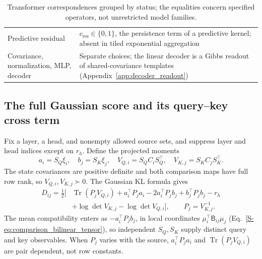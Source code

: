 \documentclass[twoside,11pt]{article}
\begin{document}
\begin{table}[tbp]
\begin{tabularx}{\textwidth}{@{}p{}X@{}}
Predictive residual & $c_{\mathrm{res}}\in\{0,1\}$, the persistence term of a predictive kernel; absent in tiled exponential aggregation \\
Covariance, normalization, MLP, decoder & Separate choices; the linear decoder is a Gibbs readout of shared-covariance templates (Appendix~\ref{app:decoder_readout}) \\
\bottomrule
\end{tabularx}
\caption{Transformer correspondences grouped by status; the equalities concern specified operators, not unrestricted model families.}
\label{tab:transformer_correspondence}
\end{table}

\subsection{The full Gaussian score and its query--key cross term}
\label{sec:dot_product_derivation}

Fix a layer, a head, and nonempty allowed source sets, and suppress layer and head indices except on $r_h$. Define the projected moments
\begin{equation}
a_i=S_Q\xi_i,\quad b_j=S_K\xi_j,\quad
V_{Q,i}=S_QC_iS_Q^\top,\quad V_{K,j}=S_KC_jS_K^\top.
\label{eq:projected_qk_moments}
\end{equation}
The state covariances are positive definite and both comparison maps have full row rank, so $V_{Q,i},V_{K,j}\succ0$. The Gaussian KL formula gives
\begin{align}
D_{ij}=\frac12\bigl[&\operatorname{Tr}(P_jV_{Q,i})
+a_i^\top P_ja_i-2a_i^\top P_jb_j+b_j^\top P_jb_j-r_h\nonumber\\
&+\log\det V_{K,j}-\log\det V_{Q,i}\bigr],
\qquad P_j=V_{K,j}^{-1}.
\label{eq:projected_full_kl}
\end{align}
The mean compatibility enters as $-a_i^\top P_jb_j$, in local coordinates $\mu_i^\top\mathsf B_{ij}\mu_j$ (Eq.~\eqref{S-eq:comparison_bilinear_tensor}), so independent $S_Q,S_K$ supply distinct query and key observables. When $P_j$ varies with the source, $a_i^\top P_ja_i$ and $\operatorname{Tr}(P_jV_{Q,i})$ are pair dependent, not row constants.
\end{document}
